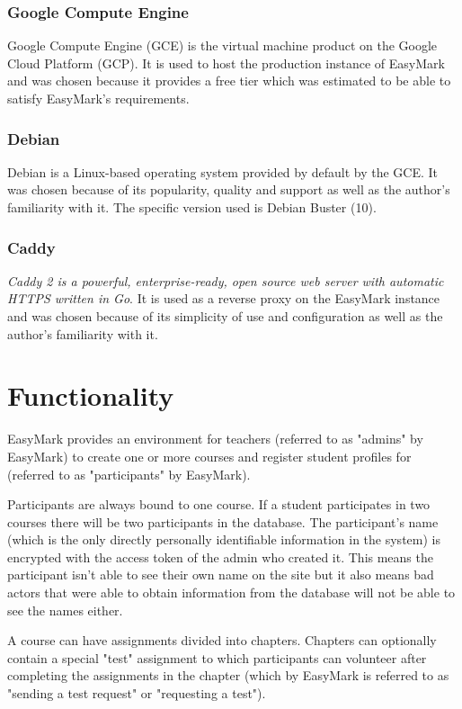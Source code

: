 \documentclass[12pt,a4paper,oneside]{report}
\begin{document}
	\subsubsection{Google Compute Engine} \label{subsubsec:googlecomputeengine}
	Google Compute Engine (GCE) is the virtual machine product on the Google Cloud Platform (GCP)\parencite{gcewebsite}. It is used to host the production instance of EasyMark and was chosen because it provides a free tier which was estimated to be able to satisfy EasyMark's requirements.

	\subsubsection{Debian} \label{subsubsec:debian}
	Debian is a Linux-based operating system\parencite{aboutdebian} provided by default by the GCE. It was chosen because of its popularity, quality and support as well as the author's familiarity with it. The specific version used is Debian Buster (10).

	\subsubsection{Caddy} \label{subsubsec:caddy}
	\emph{Caddy 2 is a powerful, enterprise-ready, open source web server with automatic HTTPS written in Go}\parencite{caddywebsite}. It is used as a reverse proxy on the EasyMark instance and was chosen because of its simplicity of use and configuration as well as the author's familiarity with it.

	\section{Functionality}
	EasyMark provides an environment for teachers (referred to as "admins" by EasyMark) to create one or more courses and register student profiles for (referred to as "participants" by EasyMark).

	Participants are always bound to one course. If a student participates in two courses there will be two participants in the database. The participant's name (which is the only directly personally identifiable information in the system) is encrypted with the access token of the admin who created it. This means the participant isn't able to see their own name on the site but it also means bad actors that were able to obtain information from the database will not be able to see the names either.

	A course can have assignments divided into chapters. Chapters can optionally contain a special "test" assignment to which participants can volunteer after completing the assignments in the chapter (which by EasyMark is referred to as "sending a test request" or "requesting a test").
\end{document}
